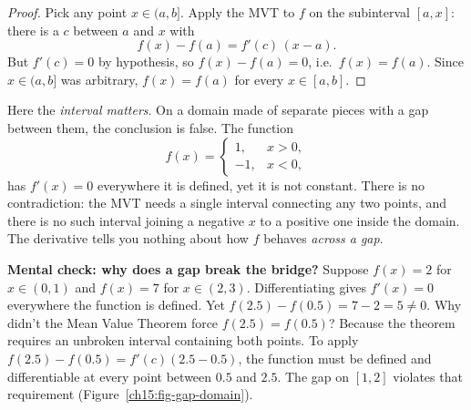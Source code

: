 \begin{proof}
Pick any point $x\in(a,b]$. Apply the MVT to $f$ on the subinterval $[a,x]$: there
is a $c$ between $a$ and $x$ with
\[
  f(x)-f(a)=f'(c)\,(x-a).
\]
But $f'(c)=0$ by hypothesis, so $f(x)-f(a)=0$, i.e.\ $f(x)=f(a)$. Since $x\in(a,b]$
was arbitrary, $f(x)=f(a)$ for every $x\in[a,b]$.
\end{proof}

\begin{trapbox}
Here the \emph{interval matters}. On a domain made of separate pieces with a gap
between them, the conclusion is false. The function
\[
  f(x)=\begin{cases}1,& x>0,\\ -1,& x<0,\end{cases}
\]
has $f'(x)=0$ everywhere it is defined, yet it is not constant. There is no
contradiction: the MVT needs a single interval connecting any two points, and there
is no such interval joining a negative $x$ to a positive one inside the domain. The
derivative tells you nothing about how $f$ behaves \emph{across a gap}.
\end{trapbox}

\begin{recoverybox}
\textbf{Mental check: why does a gap break the bridge?}
Suppose $f(x)=2$ for $x\in(0,1)$ and $f(x)=7$ for $x\in(2,3)$. Differentiating
gives $f'(x)=0$ everywhere the function is defined. Yet $f(2.5)-f(0.5)=7-2=5\ne 0$.
Why didn't the Mean Value Theorem force $f(2.5)=f(0.5)$?
Because the theorem requires an unbroken interval containing both points. To apply
$f(2.5)-f(0.5)=f'(c)(2.5-0.5)$, the function must be defined and differentiable
at every point between $0.5$ and $2.5$. The gap on $[1,2]$ violates that requirement
(Figure~\ref{ch15:fig-gap-domain}).
\end{recoverybox}


